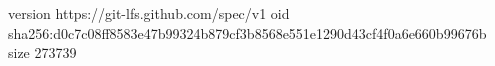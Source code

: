 version https://git-lfs.github.com/spec/v1
oid sha256:d0c7c08ff8583e47b99324b879cf3b8568e551e1290d43cf4f0a6e660b99676b
size 273739
